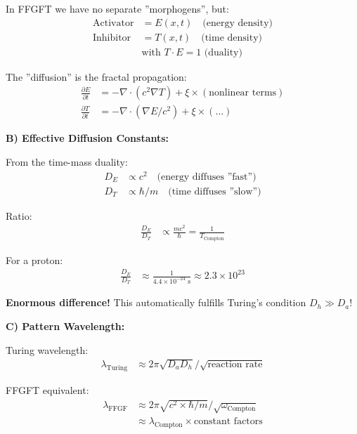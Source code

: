 	In FFGFT we have no separate ''morphogens'', but:
	\begin{align*}
		\text{Activator} &= E(x,t) \quad \text{(energy density)} \\
		\text{Inhibitor} &= T(x,t) \quad \text{(time density)} \\
		&\text{with } T \cdot E = 1 \text{ (duality)}
	\end{align*}
	
	The ''diffusion'' is the fractal propagation:
	\begin{align*}
		\frac{\partial E}{\partial t} &= -\nabla \cdot (c^2 \nabla T) + \xi \times (\text{nonlinear terms}) \\
		\frac{\partial T}{\partial t} &= -\nabla \cdot (\nabla E/c^2) + \xi \times (\dots)
	\end{align*}
	
	\textbf{B) Effective Diffusion Constants:}
	
	From the time-mass duality:
	\begin{align*}
		D_E &\propto c^2 \quad \text{(energy diffuses ''fast'')} \\
		D_T &\propto \hbar/m \quad \text{(time diffuses ''slow'')}
	\end{align*}
	
	Ratio:
	\begin{align*}
		\frac{D_E}{D_T} &\propto \frac{m c^2}{\hbar} = \frac{1}{T_{\text{Compton}}}
	\end{align*}
	
	For a proton:
	\begin{align*}
		\frac{D_E}{D_T} &\approx \frac{1}{4.4 \times 10^{-24} \text{ s}} \approx 2.3 \times 10^{23}
	\end{align*}
	
	\textbf{Enormous difference!} This automatically fulfills Turing's condition $D_h \gg D_a$!
	
	\textbf{C) Pattern Wavelength:}
	
	Turing wavelength:
	\begin{align*}
		\lambda_{\text{Turing}} &\approx 2\pi \sqrt{D_a D_h} / \sqrt{\text{reaction rate}}
	\end{align*}
	
	FFGFT equivalent:
	\begin{align*}
		\lambda_{\text{FFGF}} &\approx 2\pi \sqrt{c^2 \times \hbar/m} / \sqrt{\omega_{\text{Compton}}} \\
		&\approx \lambda_{\text{Compton}} \times \text{constant factors}
	\end{align*}
	
